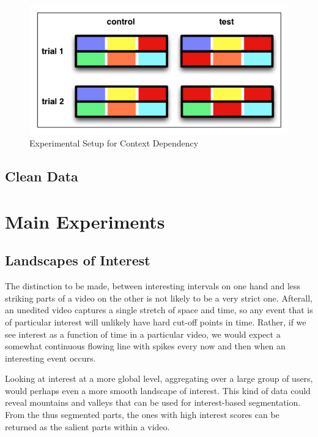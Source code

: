 \begin{figure}[htbp]
  \centering
    \includegraphics[width = .7\textwidth]{img/exp_context}
  \caption{Experimental Setup for Context Dependency}
  \label{fig:exp_context}
\end{figure}



\subsection{Clean Data} %
\label{sub:clean_data}



\section{Main Experiments} %
\label{sec:main_experiments}



\subsection{Landscapes of Interest}

The distinction to be made, between interesting intervals on one hand and less striking parts of a video on the other is not likely to be a very strict one. Afterall, an unedited video captures a single stretch of space and time, so any event that is of particular interest will unlikely have hard cut-off points in time. Rather, if we see interest as a function of time in a particular video, we would expect a somewhat continuous flowing line with spikes every now and then when an interesting event occurs. 

Looking at interest at a more global level, aggregating over a large group of users, would perhaps even a more smooth landscape of interest. This kind of data could reveal mountains and valleys that can be used for interest-based segmentation. From the thus segmented parts, the ones with high interest scores can be returned as the salient parts within a video.

